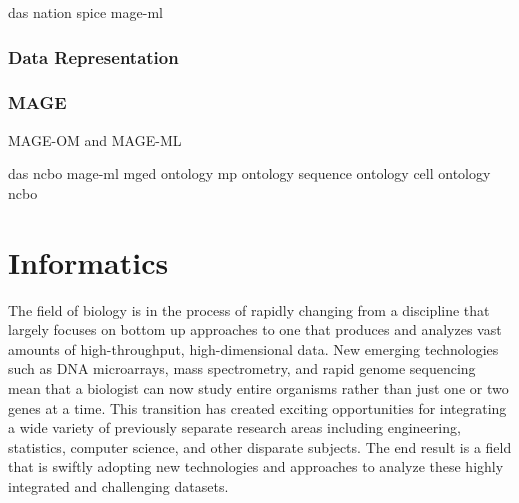 das			\cite{PMID_11667947}
nation			\cite{nation}
spice			\cite{PMID_16204122}
mage-ml			\cite{PMID_12225585}

\subsubsection{Data Representation}
\subsubsection{MAGE}
\label{MAGE}
MAGE-OM and MAGE-ML

das			\cite{PMID_11667947}
ncbo			\cite{PMID_16901225}
mage-ml			\cite{PMID_12225585}
mged ontology		\cite{PMID_16428806}
mp ontology		\cite{PMID_15642099}
sequence ontology	\cite{PMID_15892872}
cell ontology		\cite{PMID_15693950}
ncbo			\cite{PMID_16901225}

\section{Informatics}
The field of biology is in the process of rapidly changing from a discipline
that largely focuses on bottom up approaches to one that produces and analyzes
vast amounts of high-throughput, high-dimensional data. New emerging
technologies such as DNA microarrays, mass spectrometry, and rapid genome
sequencing mean that a biologist can now study entire organisms rather than just
one or two genes at a time.  This transition has created exciting opportunities
for integrating a wide variety of previously separate research areas including
engineering, statistics, computer science, and other disparate subjects.  The
end result is a field that is swiftly adopting new technologies and approaches
to analyze these highly integrated and challenging datasets. 

